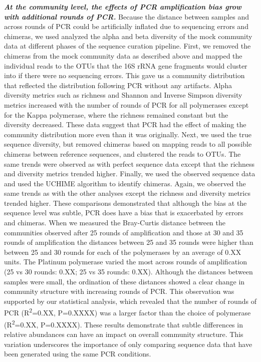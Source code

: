 \documentclass[11,]{article}
\begin{document}
\textbf{\emph{At the community level, the effects of PCR amplification
bias grow with additional rounds of PCR.}} Because the distance between
samples and across rounds of PCR could be artificially inflated due to
sequencing errors and chimeras, we used analyzed the alpha and beta
diversity of the mock community data at different phases of the sequence
curation pipeline. First, we removed the chimeras from the mock
community data as described above and mapped the individual reads to the
OTUs that the 16S rRNA gene fragments would cluster into if there were
no sequencing errors. This gave us a community distribution that
reflected the distribution following PCR without any artifacts. Alpha
diversity metrics such as richness and Shannon and Inverse Simpson
diversity metrics increased with the number of rounds of PCR for all
polymerases except for the Kappa polymerase, where the richness remained
constant but the diversity decreased. These data suggest that PCR had
the effect of making the community distribution more even than it was
originally. Next, we used the true sequence diversity, but removed
chimeras based on mapping reads to all possible chimeras between
reference sequences, and clustered the reads to OTUs. The same trends
were observed as with perfect sequence data except that the richness and
diversity metrics trended higher. Finally, we used the observed sequence
data and used the UCHIME algorithm to identify chimeras. Again, we
observed the same trends as with the other analyses except the richness
and diversity metrics trended higher. These comparisons demonstrated
that although the bias at the sequence level was subtle, PCR does have a
bias that is exacerbated by errors and chimeras. When we measured the
Bray-Curtis distance between the communities observed after 25 rounds of
amplification and those at 30 and 35 rounds of amplification the
distances between 25 and 35 rounds were higher than between 25 and 30
rounds for each of the polymerases by an average of 0.XX units. The
Platinum polymerase varied the most across rounds of amplification (25
vs 30 rounds: 0.XX; 25 vs 35 rounds: 0.XX). Although the distances
between samples were small, the ordination of these distances showed a
clear change in community structure with increasing rounds of PCR. This
observation was supported by our statistical analysis, which revealed
that the number of rounds of PCR (R\textsuperscript{2}=0.XX, P=0.XXXX)
was a larger factor than the choice of polymerase
(R\textsuperscript{2}=0.XX, P=0.XXXX). These results demonstrate that
subtle differences in relative abundances can have an impact on overall
community structure. This variation underscores the importance of only
comparing sequence data that have been generated using the same PCR
conditions.
\end{document}
